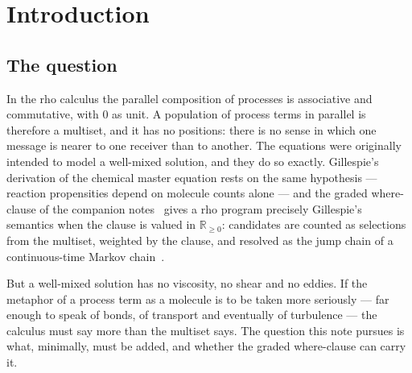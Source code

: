 \documentclass[11pt,a4paper]{article}
\theoremstyle{plain}
\theoremstyle{definition}
\theoremstyle{remark}
\newcommand{\rhoc}{\textsf{rho}}
\newcommand{\Rnn}{\mathbb{R}_{\geq 0}}
\begin{document}
\begin{abstract}
Three worked examples close the note: the small kernels (association, which
is bonding; exchange; fission); collisional activation in the
Lindemann--Hinshelwood mechanism, whose fall-off curve the kernel reproduces;
and, as the example that is more than a toy, a lattice gas whose shear
viscosity is produced by the collision kernel. The two-body kernel on a square
lattice has a conserved quantity on every row and its shear wave never decays;
the two-body kernel on a hexagonal lattice still has one on every horizontal
line, and its shear wave stalls at the predicted two thirds; adding the
three-body term removes the invariant, the shear wave decays, and the measured
viscosity falls with the collision parameter, as a mean-free-path term in
$1/\lambda$ on top of a contribution from the lattice itself.
\end{abstract}

\tableofcontents

\section{Introduction}\label{sec:intro}

\subsection{The question}

In the \rhoc{} calculus the parallel composition of processes is associative
and commutative, with $0$ as unit. A population of process terms in parallel is
therefore a multiset, and it has no positions: there is no sense in which one
message is nearer to one receiver than to another. The equations were
originally intended to model a well-mixed solution, and they do so exactly.
Gillespie's derivation of the chemical master equation rests on the same
hypothesis --- reaction propensities depend on molecule counts alone --- and the
graded where-clause of the companion notes~\cite{GW,PLN,WGSLT} gives a
\rhoc{} program precisely Gillespie's semantics when the clause is valued in
$\Rnn$: candidates are counted as selections from the multiset, weighted by
the clause, and resolved as the jump chain of a continuous-time Markov
chain~\cite{Gillespie}.

But a well-mixed solution has no viscosity, no shear and no eddies. If the
metaphor of a process term as a molecule is to be taken more seriously ---
far enough to speak of bonds, of transport and eventually of turbulence --- the
calculus must say more than the multiset says. The question this note pursues is
what, minimally, must be added, and whether the graded where-clause can carry
it.
\end{document}
